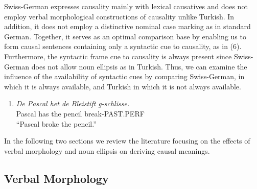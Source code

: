 \documentclass[man]{apa6}
\providecommand{\tightlist}{%
  \setlength{\itemsep}{0pt}\setlength{\parskip}{0pt}}
\begin{document}
Swiss-German expresses causality mainly with lexical causatives and does
not employ verbal morphological constructions of causality unlike
Turkish. In addition, it does not employ a distinctive nominal case
marking as in standard German. Together, it serves as an optimal
comparison base by enabling us to form causal sentences containing only
a syntactic cue to causality, as in (6). Furthermore, the syntactic
frame cue to causality is always present since Swiss-German does not allow noun
ellipsis as in Turkish. Thus, we can examine the influence of the
availability of syntactic cues by comparing Swiss-German, in which it is
always available, and Turkish in which it is not always available.

\begin{enumerate}
\def\labelenumi{(\arabic{enumi})}
\setcounter{enumi}{5}
\tightlist
\item
  \emph{De Pascal het de Bleistift g-schlisse.}\\
  Pascal has the pencil break-PAST.PERF\\
  \enquote{Pascal broke the pencil.}
\end{enumerate}

In the following two sections we review the literature focusing on the
effects of verbal morphology and noun ellipsis on deriving causal
meanings.

\subsection{Verbal Morphology}\label{verbal-morphology}
\end{document}
